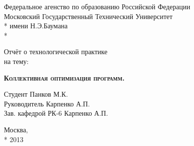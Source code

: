 \begin{titlepage}
    \newpage
    
    \begin{center}
        Федеральное агенство по образованию Российской Федерации \\
        Московский Государственный Технический Университет \\*
        имени Н.Э.Баумана \\*
        \vspace{-12mm}
        \begin{figure}[h]
        \end{figure}
        \vspace{-16mm}
        \hrulefill
    \end{center}
    \begin{center}
        \Large Отчёт о технологической практике\\ на тему:
    \end{center}
    
    \vspace{2.5em}
    
    \begin{center}
        \textsc{\textbf{Коллективная оптимизация программ.}}
    \end{center}
    
    \vspace{6em}
    
    \begin{flushleft}
        \hspace{8.5cm}Студент \hrulefill Панков М.К. \\
        \vspace{1.5em}
        \hspace{8.5cm}Руководитель \hrulefill Карпенко А.П.\\
        \vspace{1.5em}
        \hspace{8.5cm}Зав. кафедрой РК-6 \hrulefill Карпенко А.П.
    \end{flushleft}
    
    \vspace{\fill}
    
    \begin{center}
        Москва, \\*
        2013
    \end{center}

\end{titlepage}